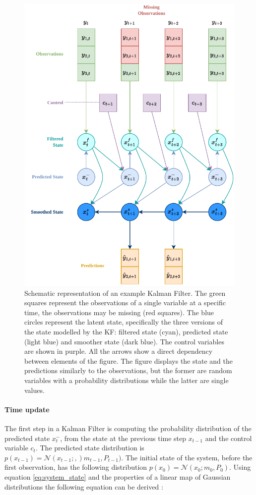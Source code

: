 \documentclass{article}
\newcommand{\norm}[3]{\mathcal{N}\left(#1; #2, #3\right)} %
\begin{document}
\begin{figure}
\centerline{\includegraphics[width=4.5in]{Kalman Filter figure}}
\caption{Schematic representation of an example Kalman Filter. The green squares represent the observations of a single variable at a specific time, the observations may be missing (red squares). The blue circles represent the latent state, specifically the three versions of the state modelled by the KF: filtered state (cyan), predicted state (light blue) and smoother state (dark blue). The control variables are shown in purple.
All the arrows show a direct dependency between elements of the figure. The figure displays the state and the predictions similarly to the observations, but the former are random variables with a probability distributions while the latter are single values.}
\label{fig:kalman_filter}
\end{figure}

\paragraph{Time update}

The first step in a Kalman Filter is computing the probability distribution of the predicted state $x^-_t$, from the state at the previous time step $x_{t-1}$ and the control variable $c_t$. The predicted state distribution is $p(x_{t-1}) = \norm{x_{t-1}}{}{}m_{t-1}, P_{t-1})$. The initial state of the system, before the first observation, has the following distribution $p(x_0) = \norm{x_0}{m_0}{P_0}$.  Using equation \ref{eq:system_state} and the properties of a linear map of Gaussian distributions the following equation can be derived \cite{bishop_pattern_2006, 2020_hennig_pml}:
\end{document}
